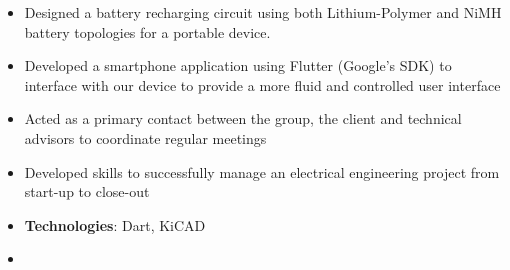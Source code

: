 \documentclass[10pt, letterpaper, ragged2e, withhyper]{altacv}
\begin{document}
\begin{paracol}{2}
            
    
    \begin{itemize}
        \item Designed a battery recharging circuit using both Lithium-Polymer and NiMH battery topologies for a portable device. 
        \item Developed a smartphone application using Flutter (Google's SDK) to interface with our device to provide a more fluid and controlled user interface
        \item Acted as a primary contact between the group, the client and technical advisors to coordinate regular meetings 
        \item Developed skills to successfully manage an electrical engineering project from start-up to close-out
        \item \textbf{Technologies}: Dart, KiCAD 
    \end{itemize}

\switchcolumn








    \begin{itemize}
        \item 
    \end{itemize}


\end{paracol}
\end{document}
